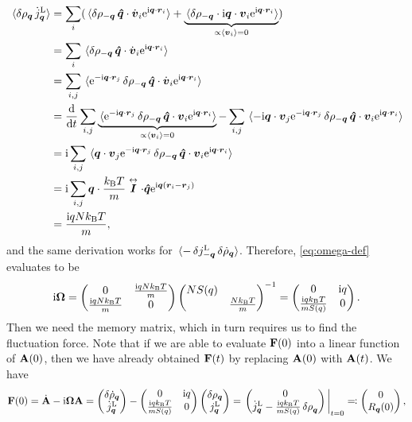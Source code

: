 \documentclass[hyperref, a4paper]{article}
\newcommand*{\ii}{\mathrm{i}}
\newcommand*{\ee}{\mathrm{e}}
\renewcommand{\tensor}[1]{ \stackrel{\leftrightarrow}{\vb*{#1}}}
\begin{document}
\[
    \begin{aligned}
        \expval*{\var{\rho_{\vb*{q}}} \dot{j}^\text{L}_{\vb*{q}}} &= 
        \sum_i (\expval*{\var{\rho_{-\vb*{q}}} \vu*{q} \cdot \dot{\vb*{v}}_i \ee^{\ii \vb*{q} \cdot \vb*{r}_i}} +
        \underbrace{\expval*{\var{\rho_{-\vb*{q}}} \cdot \ii \vb*{q} \cdot \vb*{v}_i \ee^{\ii \vb*{q} \cdot \vb*{r}_i}}}_{\propto \expval*{\vb*{v}_i} = 0} ) \\
        &= \sum_i \expval*{\var{\rho_{-\vb*{q}}} \vu*{q} \cdot \dot{\vb*{v}}_i \ee^{\ii \vb*{q} \cdot \vb*{r}_i}} \\
        &= \sum_{i, j} \expval*{\ee^{- \ii \vb*{q} \cdot \vb*{r}_j} \var{\rho_{-\vb*{q}}} \vu*{q} \cdot \dot{\vb*{v}}_i \ee^{\ii \vb*{q} \cdot \vb*{r}_i}} \\
        &= \dv{t} \sum_{i, j} \underbrace{\expval*{\ee^{- \ii \vb*{q} \cdot \vb*{r}_j} \var{\rho_{-\vb*{q}}} \vu*{q} \cdot {\vb*{v}}_i \ee^{\ii \vb*{q} \cdot \vb*{r}_i}}}_{\propto \expval*{\vb*{v}_i} = 0} - \sum_{i, j} \expval*{ - \ii \vb*{q} \cdot \vb*{v}_j \ee^{- \ii \vb*{q} \cdot \vb*{r}_j} \var{\rho_{-\vb*{q}}} \vu*{q} \cdot {\vb*{v}}_i \ee^{\ii \vb*{q} \cdot \vb*{r}_i}} \\
        &= \ii \sum_{i, j} \expval*{ \vb*{q} \cdot \vb*{v}_j \ee^{- \ii \vb*{q} \cdot \vb*{r}_j} \var{\rho_{-\vb*{q}}} \vu*{q} \cdot {\vb*{v}}_i \ee^{\ii \vb*{q} \cdot \vb*{r}_i}} \\
        &= \ii \sum_{i, j}  \vb*{q} \cdot \frac{k_\text{B} T}{m} \tensor{\vb*{I}} \cdot \vu*{q} \ee^{\ii \vb*{q} (\vb*{r}_i - \vb*{r}_j)} \\
        &= \frac{\ii q N k_\text{B} T}{m},
    \end{aligned}
\]
and the same derivation works for $\expval*{-\var{j^\text{L}_{-\vb*{q}}} \var{\dot{\rho}_{\vb*{q}}} }$.
Therefore, \eqref{eq:omega-def} evaluates to be 
\begin{equation}
    \ii \vb{\Omega} = \pmqty{0 & \frac{\ii q N k_\text{B} T}{m} \\ \frac{\ii q N k_\text{B} T}{m} & 0} \pmqty{\dmat{NS(q), \frac{N k_\text{B} T}{m}}}^{-1} = \pmqty{0 & \ii q \\ \frac{\ii q k_\text{B} T}{m S(q)} & 0}.
    \label{eq:omega-eq}
\end{equation}
Then we need the memory matrix, which in turn requires us to find the fluctuation force. Note that if we 
are able to evaluate $\vb{F}(0)$ into a linear function of $\vb{A}(0)$, then we have already obtained 
$\vb{F}(t)$ by replacing $\vb{A}(0)$ with $\vb{A}(t)$. We have 
\[
    \vb{F}(0) = \dot{\vb{A}} - \ii \vb{\Omega} \vb{A} = \pmqty{\var{\dot{\rho}_{\vb*{q}}} \\ \dot{j}_{\vb*{q}}^\text{L}} - \pmqty{0 & \ii q \\ \frac{\ii q k_\text{B} T}{m S(q)} & 0} \pmqty{\var{\rho_{\vb*{q}}} \\ j_{\vb*{q}}^\text{L}} = \eval{\pmqty{0 \\ \dot{j}_{\vb*{q}}^\text{L} - \frac{\ii q k_\text{B} T}{m S(q)} \var{\rho}_{\vb*{q}} } }_{t=0} \eqqcolon \pmqty{0 \\ R_{\vb*{q}}(0)}, 
\]
\end{document}
